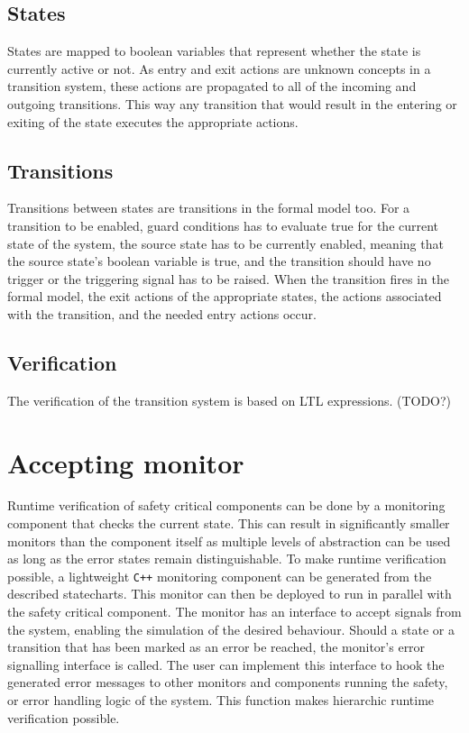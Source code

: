 {  \subsection{States}
States are mapped to boolean variables that represent whether the state is currently active or not. As entry and exit actions are unknown concepts in a transition system, these actions are propagated to all of the incoming and outgoing transitions. This way any transition that would result in the entering or exiting of the state executes the appropriate actions.
  \subsection{Transitions}
Transitions between states are transitions in the formal model too. For a transition to be enabled, guard conditions has to evaluate true for the current state of the system, the source state has to be currently enabled, meaning that the source state's boolean variable is true, and the transition should have no trigger or the triggering signal has to be raised. When the transition fires in the formal model, the exit actions of the appropriate states, the actions associated with the transition, and the needed entry actions occur.
  \subsection{Verification}
The verification of the transition system is based on LTL expressions. (TODO?)
\section{Accepting monitor}
Runtime verification of safety critical components can be done by a monitoring component that checks the current state. This can result in significantly smaller monitors than the component itself as multiple levels of abstraction can be used as long as the error states remain distinguishable. To make runtime verification possible, a lightweight \verb!C++! monitoring component can be generated from the described statecharts. This monitor can then be deployed to run in parallel with the safety critical component. The monitor has an interface to accept signals from the system, enabling the simulation of the desired behaviour. Should a state or a transition that has been marked as an error be reached, the monitor's error signalling interface is called. The user can implement this interface to hook the generated error messages to other monitors and components running the safety, or error handling logic of the system. This function makes hierarchic runtime verification possible.
}
